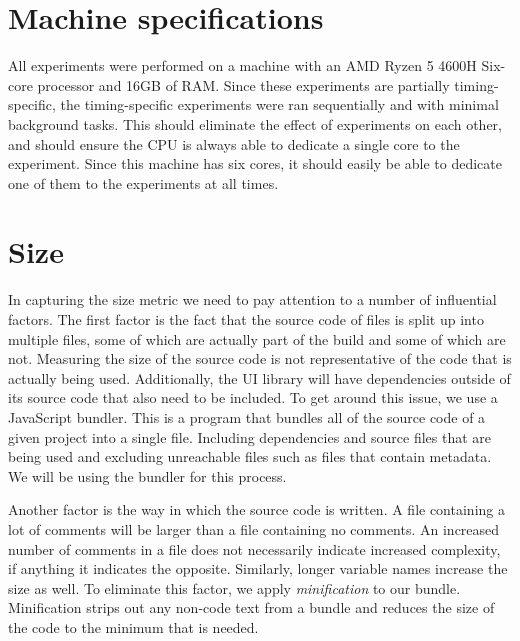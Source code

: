 \section{Machine specifications}\label{sec:experimental-setup:machine-specs}
All experiments were performed on a machine with an AMD Ryzen 5 4600H Six-core processor and 16GB of RAM. Since these experiments are partially timing-specific, the timing-specific experiments were ran sequentially and with minimal background tasks. This should eliminate the effect of experiments on each other, and should ensure the CPU is always able to dedicate a single core to the experiment. Since this machine has six cores, it should easily be able to dedicate one of them to the experiments at all times.

\section{Size}\label{sec:experimental-setup:size}
In capturing the size metric we need to pay attention to a number of influential factors. The first factor is the fact that the source code of files is split up into multiple files, some of which are actually part of the build and some of which are not. Measuring the size of the source code is not representative of the code that is actually being used. Additionally, the UI library will have dependencies outside of its source code that also need to be included. To get around this issue, we use a JavaScript bundler. This is a program that bundles all of the source code of a given project into a single file. Including dependencies and source files that are being used and excluding unreachable files such as files that contain metadata. We will be using the  bundler for this process.

Another factor is the way in which the source code is written. A file containing a lot of comments will be larger than a file containing no comments. An increased number of comments in a file does not necessarily indicate increased complexity, if anything it indicates the opposite. Similarly, longer variable names increase the size as well. To eliminate this factor, we apply \emph{minification} to our bundle. Minification strips out any non-code text from a bundle and reduces the size of the code to the minimum that is needed.

